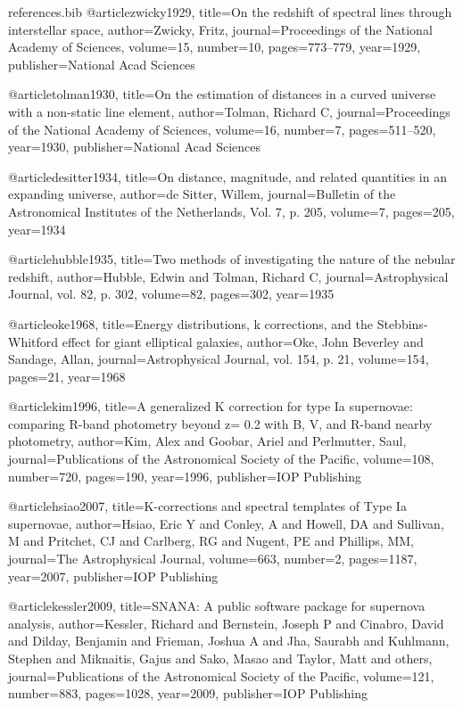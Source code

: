 \documentclass[aps,prl,reprint,amsmath,floatfix]{revtex4-2}
\begin{document}
\begin{filecontents}{references.bib}
@article{zwicky1929,
  title={On the redshift of spectral lines through interstellar space},
  author={Zwicky, Fritz},
  journal={Proceedings of the National Academy of Sciences},
  volume={15},
  number={10},
  pages={773--779},
  year={1929},
  publisher={National Acad Sciences}
}

@article{tolman1930,
  title={On the estimation of distances in a curved universe with a non-static line element},
  author={Tolman, Richard C},
  journal={Proceedings of the National Academy of Sciences},
  volume={16},
  number={7},
  pages={511--520},
  year={1930},
  publisher={National Acad Sciences}
}

@article{desitter1934,
  title={On distance, magnitude, and related quantities in an expanding universe},
  author={de Sitter, Willem},
  journal={Bulletin of the Astronomical Institutes of the Netherlands, Vol. 7, p. 205},
  volume={7},
  pages={205},
  year={1934}
}

@article{hubble1935,
  title={Two methods of investigating the nature of the nebular redshift},
  author={Hubble, Edwin and Tolman, Richard C},
  journal={Astrophysical Journal, vol. 82, p. 302},
  volume={82},
  pages={302},
  year={1935}
}

@article{oke1968,
  title={Energy distributions, k corrections, and the Stebbins-Whitford effect for giant elliptical galaxies},
  author={Oke, John Beverley and Sandage, Allan},
  journal={Astrophysical Journal, vol. 154, p. 21},
  volume={154},
  pages={21},
  year={1968}
}

@article{kim1996,
  title={A generalized K correction for type Ia supernovae: comparing R-band photometry beyond z= 0.2 with B, V, and R-band nearby photometry},
  author={Kim, Alex and Goobar, Ariel and Perlmutter, Saul},
  journal={Publications of the Astronomical Society of the Pacific},
  volume={108},
  number={720},
  pages={190},
  year={1996},
  publisher={IOP Publishing}
}

@article{hsiao2007,
  title={K-corrections and spectral templates of Type Ia supernovae},
  author={Hsiao, Eric Y and Conley, A and Howell, DA and Sullivan, M and Pritchet, CJ and Carlberg, RG and Nugent, PE and Phillips, MM},
  journal={The Astrophysical Journal},
  volume={663},
  number={2},
  pages={1187},
  year={2007},
  publisher={IOP Publishing}
}

@article{kessler2009,
  title={SNANA: A public software package for supernova analysis},
  author={Kessler, Richard and Bernstein, Joseph P and Cinabro, David and Dilday, Benjamin and Frieman, Joshua A and Jha, Saurabh and Kuhlmann, Stephen and Miknaitis, Gajus and Sako, Masao and Taylor, Matt and others},
  journal={Publications of the Astronomical Society of the Pacific},
  volume={121},
  number={883},
  pages={1028},
  year={2009},
  publisher={IOP Publishing}
}


\end{filecontents}
\end{document}

